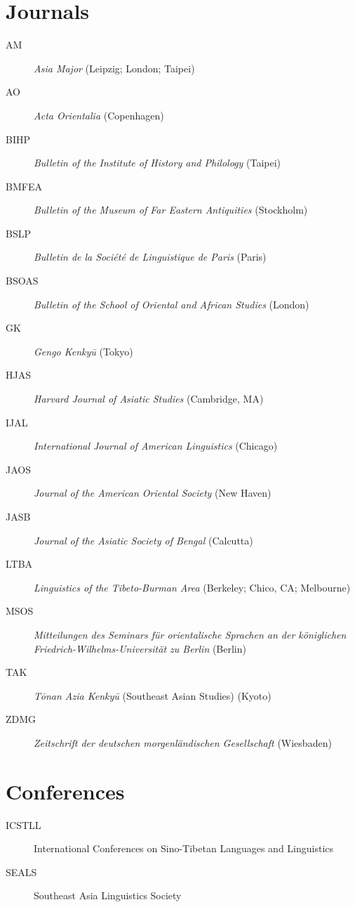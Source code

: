 \section*{Journals}
\begin{multicols}{2}
\begin{description}
\item[AM]	\textit{Asia Major} (Leipzig; London; Taipei)
\item[AO]	\textit{Acta Orientalia} (Copenhagen)
\item[BIHP]	\textit{Bulletin of the Institute of History and Philology} (Taipei)
\item[BMFEA]	\textit{Bulletin of the Museum of Far Eastern Antiquities} (Stockholm)
\item[BSLP]	\textit{Bulletin de la Société de Linguistique de Paris} (Paris)
\item[BSOAS]	\textit{Bulletin of the School of Oriental and African Studies} (London)
\item[GK]	\textit{Gengo Kenkyū} (Tokyo)
\end{description}
\end{multicols}

\pagebreak

\begin{multicols}{2}
\begin{description}
\item[HJAS]	\textit{Harvard Journal of Asiatic Studies} (Cambridge, MA)
\item[IJAL]	\textit{International Journal of American Linguistics} (Chicago)
\item[JAOS]	\textit{Journal of the American Oriental Society} (New Haven)
\item[JASB]	\textit{Journal of the Asiatic Society of Bengal} (Calcutta)
\item[LTBA]	\textit{Linguistics of the Tibeto-Burman Area} (Berkeley; Chico, CA; Melbourne)
\columnbreak
\item[MSOS]	\textit{Mitteilungen des Seminars für orientalische Sprachen an der königlichen Friedrich-Wilhelms-Universität zu Berlin} (Berlin)
\item[TAK]	\textit{Tōnan Azia Kenkyū} (Southeast Asian Studies) (Kyoto)
\item[ZDMG]	\textit{Zeitschrift der deutschen morgenländischen Gesellschaft} (Wiesbaden)
\end{description}
\end{multicols}

\section*{Conferences}
\begin{multicols}{2}
\begin{description}
\item[ICSTLL]	International Conferences on Sino-Tibetan Languages and Linguistics
\item[SEALS]	Southeast Asia Linguistics Society
\end{description}
\end{multicols}

